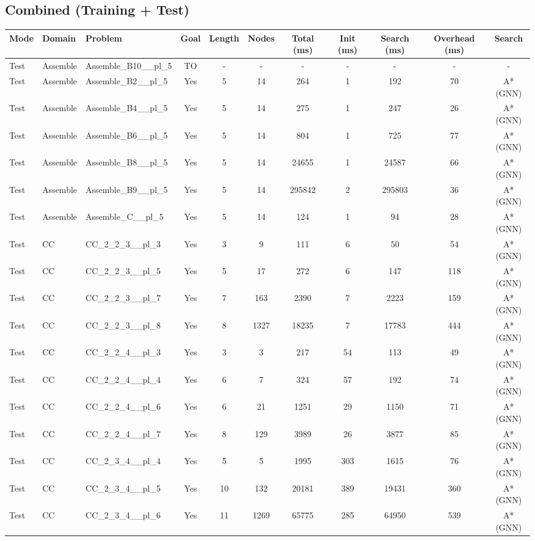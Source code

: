 \documentclass{article}
\begin{document}
\subsection*{Combined (Training + Test)}
\begin{tabular}{lllcccccccc}
\toprule
Mode & Domain & Problem & Goal & Length & Nodes & Total (ms) & Init (ms) & Search (ms) & Overhead (ms) & Search \\
\midrule
Test & Assemble & Assemble\_B10\_\_pl\_5 & TO & - & - & - & - & - & - & - \\
Test & Assemble & Assemble\_B2\_\_pl\_5 & Yes & 5 & 14 & 264 & 1 & 192 & 70 & A*(GNN) \\
Test & Assemble & Assemble\_B4\_\_pl\_5 & Yes & 5 & 14 & 275 & 1 & 247 & 26 & A*(GNN) \\
Test & Assemble & Assemble\_B6\_\_pl\_5 & Yes & 5 & 14 & 804 & 1 & 725 & 77 & A*(GNN) \\
Test & Assemble & Assemble\_B8\_\_pl\_5 & Yes & 5 & 14 & 24655 & 1 & 24587 & 66 & A*(GNN) \\
Test & Assemble & Assemble\_B9\_\_pl\_5 & Yes & 5 & 14 & 295842 & 2 & 295803 & 36 & A*(GNN) \\
Test & Assemble & Assemble\_C\_\_pl\_5 & Yes & 5 & 14 & 124 & 1 & 94 & 28 & A*(GNN) \\
Test & CC & CC\_2\_2\_3\_\_pl\_3 & Yes & 3 & 9 & 111 & 6 & 50 & 54 & A*(GNN) \\
Test & CC & CC\_2\_2\_3\_\_pl\_5 & Yes & 5 & 17 & 272 & 6 & 147 & 118 & A*(GNN) \\
Test & CC & CC\_2\_2\_3\_\_pl\_7 & Yes & 7 & 163 & 2390 & 7 & 2223 & 159 & A*(GNN) \\
Test & CC & CC\_2\_2\_3\_\_pl\_8 & Yes & 8 & 1327 & 18235 & 7 & 17783 & 444 & A*(GNN) \\
Test & CC & CC\_2\_2\_4\_\_pl\_3 & Yes & 3 & 3 & 217 & 54 & 113 & 49 & A*(GNN) \\
Test & CC & CC\_2\_2\_4\_\_pl\_4 & Yes & 6 & 7 & 324 & 57 & 192 & 74 & A*(GNN) \\
Test & CC & CC\_2\_2\_4\_\_pl\_6 & Yes & 6 & 21 & 1251 & 29 & 1150 & 71 & A*(GNN) \\
Test & CC & CC\_2\_2\_4\_\_pl\_7 & Yes & 8 & 129 & 3989 & 26 & 3877 & 85 & A*(GNN) \\
Test & CC & CC\_2\_3\_4\_\_pl\_4 & Yes & 5 & 5 & 1995 & 303 & 1615 & 76 & A*(GNN) \\
Test & CC & CC\_2\_3\_4\_\_pl\_5 & Yes & 10 & 132 & 20181 & 389 & 19431 & 360 & A*(GNN) \\
Test & CC & CC\_2\_3\_4\_\_pl\_6 & Yes & 11 & 1269 & 65775 & 285 & 64950 & 539 & A*(GNN) \\

\end{tabular}
\end{document}
